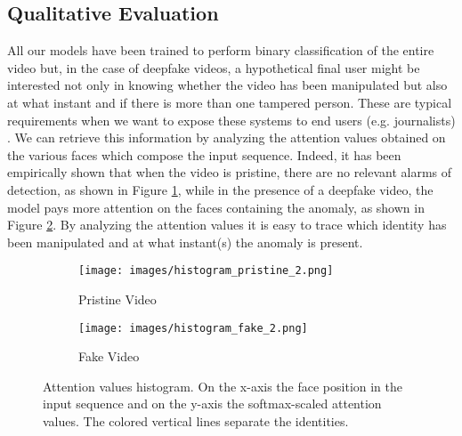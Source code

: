 \documentclass[10pt,twocolumn,letterpaper]{article}
\begin{document}
\subsection{Qualitative Evaluation}
All our models have been trained to perform binary classification of the entire video but, in the case of deepfake videos, a hypothetical final user might be interested not only in knowing whether the video has been manipulated but also at what instant and if there is more than one tampered person. These are typical requirements when we want to expose these systems to end users (e.g. journalists) \cite{meverdeepfake}.
We can retrieve this information by analyzing the attention values obtained on the various faces which compose the input sequence. Indeed, it has been empirically shown that when the video is pristine, there are no relevant alarms of detection, as shown in Figure \ref{fig:histogram_attention_a}, while in the presence of a deepfake video, the model pays more attention on the faces containing the anomaly, as shown in Figure \ref{fig:histogram_attention_b}. By analyzing the attention values it is easy to trace which identity has been manipulated and at what instant(s) the anomaly is present.
\begin{figure}[t]
\centering
\begin{subfigure}{.5\linewidth}
  \centering
  \texttt{[image: images/histogram\_pristine\_2.png]}
  \caption{Pristine Video}
  \label{fig:histogram_attention_a}
\end{subfigure}\begin{subfigure}{.5\linewidth}
  \centering
  \texttt{[image: images/histogram\_fake\_2.png]}
  \caption{Fake Video}
  \label{fig:histogram_attention_b}
\end{subfigure}
\caption{Attention values histogram. On the x-axis the face position in the input sequence and on the y-axis the softmax-scaled attention values. The colored vertical lines separate the identities.}
\label{fig:histogram_attention}
\end{figure}
\end{document}
